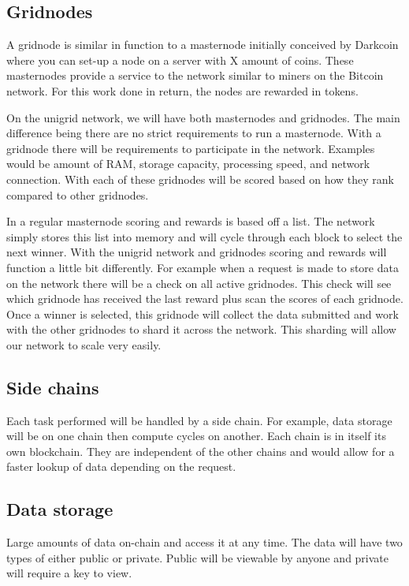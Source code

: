 \documentclass[12pt]{article}
\begin{document}
\subsection*{Gridnodes}

A gridnode is similar in function to a masternode initially conceived by Darkcoin where you can set-up a node on a server with X amount of coins. These masternodes provide a service to the network similar to miners on the Bitcoin network. For this work done in return, the nodes are rewarded in tokens.

On the unigrid network, we will have both masternodes and gridnodes. The main difference being there are no strict requirements to run a masternode. With a gridnode there will be requirements to participate in the network. Examples would be amount of RAM, storage capacity, processing speed, and network connection. With each of these gridnodes will be scored based on how they rank compared to other gridnodes.

In a regular masternode scoring and rewards is based off a list. The network simply stores this list into memory and will cycle through each block to select the next winner. With the unigrid network and gridnodes scoring and rewards will function a little bit differently. For example when a request is made to store data on the network there will be a check on all active gridnodes. This check will see which gridnode has received the last reward plus scan the scores of each gridnode. Once a winner is selected, this gridnode will collect the data submitted and work with the other gridnodes to shard it across the network. This sharding will allow our network to scale very easily.


\subsection*{Side chains}
Each task performed will be handled by a side chain. For example, data storage will be on one chain then compute cycles on another. Each chain is in itself its own blockchain. They are independent of the other chains and would allow for a faster lookup of data depending on the request.

\subsection*{Data storage}
Large amounts of data on-chain and access it at any time. The data will have two types of either public or private. Public will be viewable by anyone and private will require a key to view.
\end{document}
